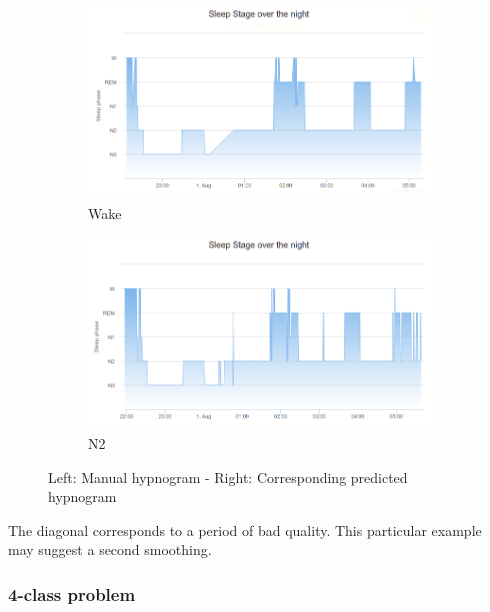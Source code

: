 \documentclass[12pt]{report}
\begin{document}
 \begin{figure}[H]
 \begin{subfigure}{0.5\textwidth}
 	\centering
 	\includegraphics[width=1\textwidth]{img/chap2/good_hypno.png}
 	\caption{Wake}
 	\label{fig:manual_hypno}
 \end{subfigure}
 \begin{subfigure}{0.5\textwidth}
 	\centering
 	\includegraphics[width=1\textwidth]{img/chap2/dreemnogram_ex.png}
 	\caption{N2}
 	\label{fig:dreemno}
 \end{subfigure}
 
  \caption{\label{fig:hypno_dreemno}Left: Manual hypnogram - Right: Corresponding predicted hypnogram}
  \end{figure}

The diagonal corresponds to a period of bad quality. This particular example may suggest a second smoothing.

\subsubsection{4-class problem}
\end{document}
